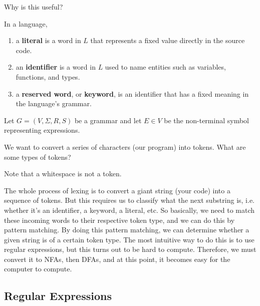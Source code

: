   Why is this useful? 

  \begin{definition}
    In a language, 
    \begin{enumerate}
      \item a \textbf{literal} is a word in $L$ that represents a fixed value directly in the source code. 
      \item an \textbf{identifier} is a word in $L$ used to name entities such as variables, functions, and types. 
      \item a \textbf{reserved word}, or \textbf{keyword}, is an identifier that has a fixed meaning in the language's grammar. 
    \end{enumerate}
  \end{definition}

  \begin{definition}[Expression]
    Let $G = (V, \Sigma, R, S)$ be a grammar and let $E \in V$ be the non-terminal symbol representing expressions. 
  \end{definition}

  \begin{definition}[Statement]
    
  \end{definition}


  We want to convert a series of characters (our program) into tokens. What are some types of tokens? 


  Note that a whitespace is not a token. 

  The whole process of lexing is to convert a giant string (your code) into a sequence of tokens. But this requires us to classify what the next substring is, i.e. whether it's an identifier, a keyword, a literal, etc. So basically, we need to match these incoming words to their respective token type, and we can do this by pattern matching. By doing this pattern matching, we can determine whether a given string is of a certain token type. The most intuitive way to do this is to use regular expressions, but this turns out to be hard to compute. Therefore, we must convert it to NFAs, then DFAs, and at this point, it becomes easy for the computer to compute. 

\subsection{Regular Expressions} 

